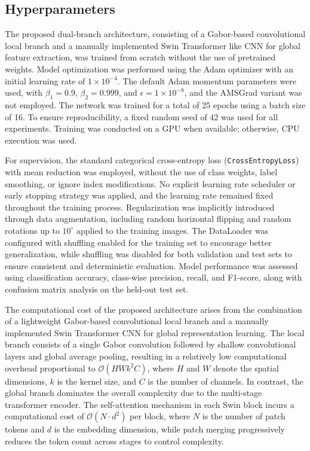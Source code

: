 \documentclass[preprint,12pt]{elsarticle}
\begin{document}
\FloatBarrier
\subsection{Hyperparameters}

The proposed dual-branch architecture, consisting of a Gabor-based convolutional local branch and a manually implemented Swin Transformer like CNN for global feature extraction, was trained from scratch without the use of pretrained weights. Model optimization was performed using the Adam optimizer with an initial learning rate of $1\times10^{-4}$. The default Adam momentum parameters were used, with $\beta_1 = 0.9$, $\beta_2 = 0.999$, and $\epsilon = 1\times10^{-8}$, and the AMSGrad variant was not employed. The network was trained for a total of 25 epochs using a batch size of 16. To ensure reproducibility, a fixed random seed of 42 was used for all experiments. Training was conducted on a GPU when available; otherwise, CPU execution was used.

For supervision, the standard categorical cross-entropy loss (\texttt{CrossEntropyLoss}) with mean reduction was employed, without the use of class weights, label smoothing, or ignore index modifications. No explicit learning rate scheduler or early stopping strategy was applied, and the learning rate remained fixed throughout the training process. Regularization was implicitly introduced through data augmentation, including random horizontal flipping and random rotations up to $10^\circ$ applied to the training images. The DataLoader was configured with shuffling enabled for the training set to encourage better generalization, while shuffling was disabled for both validation and test sets to ensure consistent and deterministic evaluation. Model performance was assessed using classification accuracy, class-wise precision, recall, and F1-score, along with confusion matrix analysis on the held-out test set.

The computational cost of the proposed architecture arises from the combination of a lightweight Gabor-based convolutional local branch and a manually implemented Swin Transformer CNN for global representation learning. The local branch consists of a single Gabor convolution followed by shallow convolutional layers and global average pooling, resulting in a relatively low computational overhead proportional to $\mathcal{O}(HWk^2C)$, where $H$ and $W$ denote the spatial dimensions, $k$ is the kernel size, and $C$ is the number of channels. In contrast, the global branch dominates the overall complexity due to the multi-stage transformer encoder. The self-attention mechanism in each Swin block incurs a computational cost of $\mathcal{O}(N \cdot d^2)$ per block, where $N$ is the number of patch tokens and $d$ is the embedding dimension, while patch merging progressively reduces the token count across stages to control complexity.
\end{document}
